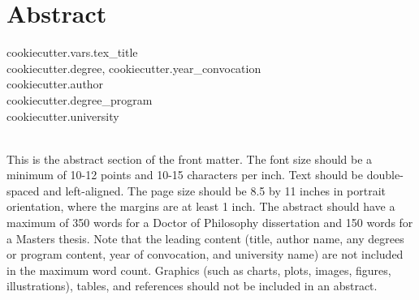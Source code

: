 

\chapter*{Abstract} \label{abstract}

{\centering
	{{cookiecutter.vars.tex_title}} \\
	{{cookiecutter.degree}}, {{cookiecutter.year_convocation}} \\
	{{cookiecutter.author}} \\
	{{cookiecutter.degree_program}} \\
	{{cookiecutter.university}} \\ ~ \\
}

This is the abstract section of the front matter. The font size should be a minimum of 10-12 points and 10-15 characters per inch. Text should be double-spaced and left-aligned. The page size should be 8.5 by 11 inches in portrait orientation, where the margins are at least 1 inch. The abstract should have a maximum of 350 words for a Doctor of Philosophy dissertation and 150 words for a Masters thesis. Note that the leading content (title, author name, any degrees or program content, year of convocation, and university name) are not included in the maximum word count. Graphics (such as charts, plots, images, figures, illustrations), tables, and references should not be included in an abstract. 
